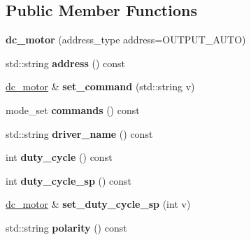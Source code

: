 \subsection*{Public Member Functions}
\begin{DoxyCompactItemize}
\item 
\mbox{\label{classev3dev_1_1dc__motor_af7b0475e5814f27b2ecc6c225995271d}} 
{\bfseries dc\+\_\+motor} (address\+\_\+type address=O\+U\+T\+P\+U\+T\+\_\+\+A\+U\+TO)
\item 
\mbox{\label{classev3dev_1_1dc__motor_a20d126f92472ef5ceab76ac42aa7a25f}} 
std\+::string {\bfseries address} () const
\item 
\mbox{\label{classev3dev_1_1dc__motor_a56c06ff1a5d12a6e5a9ec940a1a5ac93}} 
\hyperlink{classev3dev_1_1dc__motor}{dc\+\_\+motor} \& {\bfseries set\+\_\+command} (std\+::string v)
\item 
\mbox{\label{classev3dev_1_1dc__motor_a9d32c53e454c893adfd2cdbc4f0ba18f}} 
mode\+\_\+set {\bfseries commands} () const
\item 
\mbox{\label{classev3dev_1_1dc__motor_aedcbd2526aa8ff2885aeb5810a7f9514}} 
std\+::string {\bfseries driver\+\_\+name} () const
\item 
\mbox{\label{classev3dev_1_1dc__motor_a96c6142320dc46b66182aa50bef3c8be}} 
int {\bfseries duty\+\_\+cycle} () const
\item 
\mbox{\label{classev3dev_1_1dc__motor_abbe98a9b8a9679967b2c3cae3e1bb502}} 
int {\bfseries duty\+\_\+cycle\+\_\+sp} () const
\item 
\mbox{\label{classev3dev_1_1dc__motor_a5a65b00fdf2c3dd4bf25f272e8ad3113}} 
\hyperlink{classev3dev_1_1dc__motor}{dc\+\_\+motor} \& {\bfseries set\+\_\+duty\+\_\+cycle\+\_\+sp} (int v)
\item 
\mbox{\label{classev3dev_1_1dc__motor_af8dc389b7f12c5f84caeac9a3ffc9a9e}} 
std\+::string {\bfseries polarity} () const
\item 

\end{DoxyCompactItemize}
